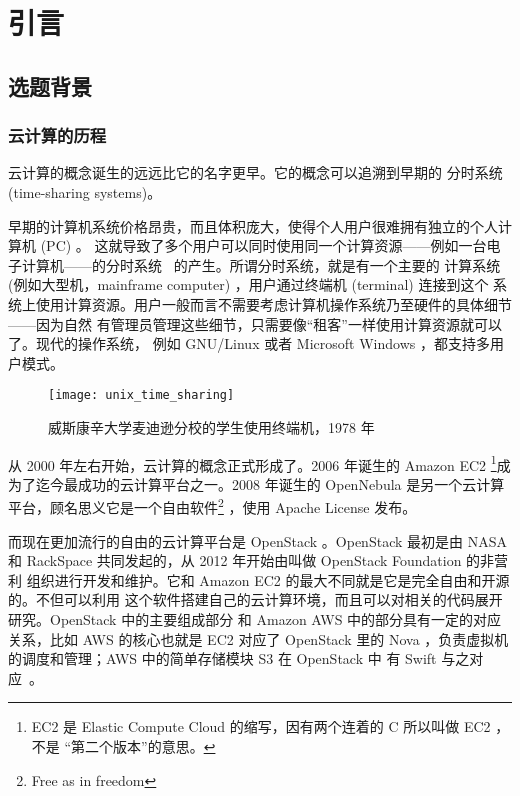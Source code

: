 \chapter{引言}
\label{cha:intro}

\section{选题背景}

\subsection{云计算的历程}
\label{subsec:history-of-cloud}

云计算的概念诞生的远远比它的名字更早。它的概念可以追溯到早期的
分时系统 (time-sharing systems)。

早期的计算机系统价格昂贵，而且体积庞大，使得个人用户很难拥有独立的个人计算机 (PC) 。
这就导致了多个用户可以同时使用同一个计算资源——例如一台电子计算机——的分时系统
~\cite{timesharing}的产生。所谓分时系统，就是有一个主要的
计算系统 (例如大型机，mainframe computer) ，用户通过终端机 (terminal) 连接到这个
系统上使用计算资源。用户一般而言不需要考虑计算机操作系统乃至硬件的具体细节——因为自然
有管理员管理这些细节，只需要像“租客”一样使用计算资源就可以了。现代的操作系统，
例如 GNU/Linux 或者 Microsoft Windows ，都支持多用户模式。

\begin{figure}[h]
    \centering
    \texttt{[image: unix\_time\_sharing]}
    \caption{威斯康辛大学麦迪逊分校的学生使用终端机，1978 年}
\end{figure}

从 2000 年左右开始，云计算的概念正式形成了。2006 年诞生的 Amazon EC2 \footnote{EC2
  是 Elastic Compute Cloud 的缩写，因有两个连着的 C 所以叫做 EC2 ，不是
  “第二个版本”的意思。}成为了迄今最成功的云计算平台之一。2008 年诞生的 OpenNebula
是另一个云计算平台，顾名思义它是一个自由软件\footnote{Free as in freedom}
，使用 Apache License 发布。

而现在更加流行的自由的云计算平台是 OpenStack 。OpenStack 最初是由
 NASA 和 RackSpace 共同发起的，从 2012 年开始由叫做 OpenStack Foundation 的非营利
组织进行开发和维护。它和 Amazon EC2 的最大不同就是它是完全自由和开源的。不但可以利用
这个软件搭建自己的云计算环境，而且可以对相关的代码展开研究。OpenStack 中的主要组成部分
和 Amazon AWS 中的部分具有一定的对应关系，比如 AWS 的核心也就是 EC2 对应了 OpenStack
 里的 Nova ，负责虚拟机的调度和管理；AWS 中的简单存储模块 S3 在 OpenStack 中
有 Swift 与之对应~\cite{openstack}。

